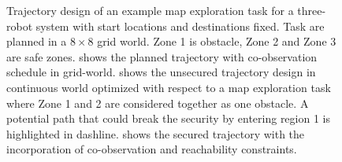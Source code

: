 \documentclass[10pt,twocolumn,twoside]{IEEEtran}
\begin{document}
\begin{figure}
  \centering

  \caption{Trajectory design of an example map exploration task for a three-robot system with start locations and destinations fixed. Task are planned in a $8 \times 8$ grid world. Zone 1 is obstacle, Zone 2 and Zone 3 are safe zones.  shows the planned trajectory with co-observation schedule in grid-world.  shows the unsecured trajectory design in continuous world optimized with respect to a map exploration task where Zone 1 and 2 are considered together as one obstacle.  A potential path that could break the security by entering region 1 is highlighted in dashline.  shows the secured trajectory with the incorporation of co-observation and reachability constraints.}
  \label{fig:example-application}
\end{figure}
\end{document}
